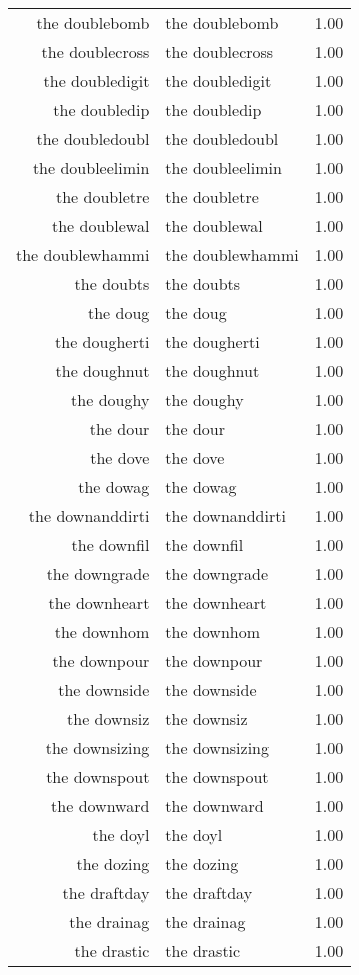 \begin{table}[ht]
\begin{tabular}{rlr}
  the doublebomb & the doublebomb & 1.00 \\ 
  the doublecross & the doublecross & 1.00 \\ 
  the doubledigit & the doubledigit & 1.00 \\ 
  the doubledip & the doubledip & 1.00 \\ 
  the doubledoubl & the doubledoubl & 1.00 \\ 
  the doubleelimin & the doubleelimin & 1.00 \\ 
  the doubletre & the doubletre & 1.00 \\ 
  the doublewal & the doublewal & 1.00 \\ 
  the doublewhammi & the doublewhammi & 1.00 \\ 
  the doubts & the doubts & 1.00 \\ 
  the doug & the doug & 1.00 \\ 
  the dougherti & the dougherti & 1.00 \\ 
  the doughnut & the doughnut & 1.00 \\ 
  the doughy & the doughy & 1.00 \\ 
  the dour & the dour & 1.00 \\ 
  the dove & the dove & 1.00 \\ 
  the dowag & the dowag & 1.00 \\ 
  the downanddirti & the downanddirti & 1.00 \\ 
  the downfil & the downfil & 1.00 \\ 
  the downgrade & the downgrade & 1.00 \\ 
  the downheart & the downheart & 1.00 \\ 
  the downhom & the downhom & 1.00 \\ 
  the downpour & the downpour & 1.00 \\ 
  the downside & the downside & 1.00 \\ 
  the downsiz & the downsiz & 1.00 \\ 
  the downsizing & the downsizing & 1.00 \\ 
  the downspout & the downspout & 1.00 \\ 
  the downward & the downward & 1.00 \\ 
  the doyl & the doyl & 1.00 \\ 
  the dozing & the dozing & 1.00 \\ 
  the draftday & the draftday & 1.00 \\ 
  the drainag & the drainag & 1.00 \\ 
  the drastic & the drastic & 1.00 \\ 

\end{tabular}
\end{table}
